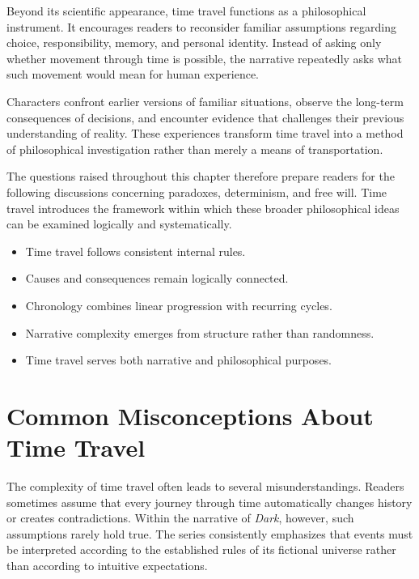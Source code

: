 \documentclass[12pt,oneside,openany]{book}
\begin{document}
Beyond its scientific appearance, time travel functions as a philosophical
instrument. It encourages readers to reconsider familiar assumptions regarding
choice, responsibility, memory, and personal identity. Instead of asking only
whether movement through time is possible, the narrative repeatedly asks what
such movement would mean for human experience.

Characters confront earlier versions of familiar situations, observe the
long-term consequences of decisions, and encounter evidence that challenges
their previous understanding of reality. These experiences transform time
travel into a method of philosophical investigation rather than merely a means
of transportation.

The questions raised throughout this chapter therefore prepare readers for the
following discussions concerning paradoxes, determinism, and free will. Time
travel introduces the framework within which these broader philosophical ideas
can be examined logically and systematically.

\begin{tcolorbox}[colback=orange!8,colframe=orange!70!black,title=Chapter Takeaways]
\begin{itemize}
\item Time travel follows consistent internal rules.
\item Causes and consequences remain logically connected.
\item Chronology combines linear progression with recurring cycles.
\item Narrative complexity emerges from structure rather than randomness.
\item Time travel serves both narrative and philosophical purposes.
\end{itemize}
\end{tcolorbox}
\section{Common Misconceptions About Time Travel}

The complexity of time travel often leads to several misunderstandings. Readers
sometimes assume that every journey through time automatically changes history
or creates contradictions. Within the narrative of \textit{Dark}, however,
such assumptions rarely hold true. The series consistently emphasizes that
events must be interpreted according to the established rules of its fictional
universe rather than according to intuitive expectations.
\end{document}
